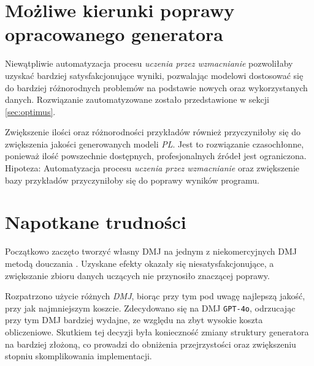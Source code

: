 \section{Możliwe kierunki poprawy opracowanego generatora}
Niewątpliwie automatyzacja procesu \textit{uczenia przez wzmacnianie} pozwoliłaby uzyskać bardziej satysfakcjonujące wyniki, pozwalając modelowi dostosować się do bardziej różnorodnych problemów na podstawie nowych oraz wykorzystanych danych. Rozwiązanie zautomatyzowane zostało przedstawione w sekcji \ref{sec:optimus}. %

Zwiększenie ilości oraz różnorodności przykładów również przyczyniłoby się do zwiększenia jakości generowanych modeli \textit{PL}. Jest to rozwiązanie czasochłonne, ponieważ ilość powszechnie dostępnych, profesjonalnych źródeł jest ograniczona.
Hipoteza: Automatyzacja procesu \textit{uczenia przez wzmacnianie} oraz zwiększenie bazy przykładów przyczyniłoby się do poprawy wyników programu.

\section{Napotkane trudności}

Początkowo zaczęto tworzyć własny DMJ na jednym z niekomercyjnych DMJ metodą douczania . Uzyskane efekty okazały się niesatysfakcjonujące, a zwiększanie zbioru danych uczących nie przynosiło znaczącej poprawy.


Rozpatrzono użycie różnych \textit{DMJ}, biorąc przy tym pod uwagę najlepszą jakość, przy jak najmniejszym koszcie. %
Zdecydowano się na DMJ \texttt{GPT-4o}, odrzucając przy tym DMJ bardziej wydajne, %
ze względu na zbyt wysokie koszta obliczeniowe. Skutkiem tej decyzji była konieczność zmiany struktury generatora na bardziej złożoną, co prowadzi do obniżenia przejrzystości oraz zwiększeniu stopniu skomplikowania implementacji.